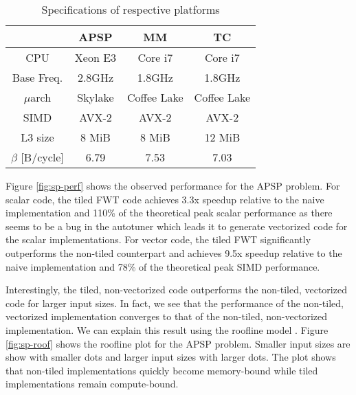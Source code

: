 \begin{table}[h]
\centering
\begin{tabular}{ | c | c | c | c | }
 \hline
  & APSP & MM & TC \\ 
 \hline
 CPU & Xeon E3 & Core i7 & Core i7\\
 Base Freq. & 2.8GHz & 1.8GHz & 1.8GHz\\
 $\mu$arch & Skylake & Coffee Lake & Coffee Lake\\
 SIMD & AVX-2 & AVX-2 & AVX-2 \\
 L3 size & 8 MiB & 8 MiB & 12 MiB\\
 $\beta$ [B/cycle] & 6.79 & 7.53 & 7.03\\
 \hline
\end{tabular}
\caption{Specifications of respective platforms}
\label{tbl:system}
\end{table}


Figure \ref{fig:sp-perf} shows the observed performance for the APSP problem. For scalar code, the tiled FWT
code achieves 3.3x speedup relative to the naive implementation and 110\% of the theoretical peak scalar performance
as there seems to be a bug in the autotuner which leads it to generate vectorized code for the scalar implementations.
For vector code, the tiled FWT significantly outperforms the non-tiled counterpart and achieves 9.5x
speedup relative to the naive implementation and 78\% of the theoretical peak SIMD performance.

Interestingly, the tiled, non-vectorized code outperforms the non-tiled, vectorized code for larger
input sizes. In fact, we see that the performance of the non-tiled, vectorized implementation
converges to that of the non-tiled, non-vectorized implementation. We can explain this result using
the roofline model \cite{williams2009roofline}. Figure \ref{fig:sp-roof} shows the roofline plot for
the APSP problem. Smaller input sizes are show with smaller dots and larger input sizes with larger dots.
The plot shows that non-tiled implementations quickly become memory-bound while tiled implementations
remain compute-bound.

